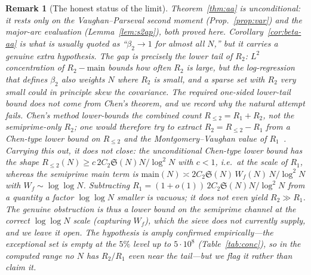 \documentclass[]{interact}%
\newtheorem{remark}{Remark}
\newcommand{\sing}{\mathfrak S}
\begin{document}
\begin{remark}[The honest status of the limit]
Theorem~\ref{thm:aa} is unconditional: it rests only on the Vaughan--Parseval second moment
(Prop.~\ref{prop:var}) and the major-arc evaluation (Lemma~\ref{lem:s2ap}), both proved here.
Corollary~\ref{cor:beta-aa} is what is usually quoted as ``$\beta_2\to1$ for almost all $N$,''
but it carries a genuine extra hypothesis. The gap is precisely the lower tail of $R_2$:
$L^2$ concentration of $R_2-\mathrm{main}$ bounds how often $R_2$ is \emph{large}, but the
log-regression that defines $\beta_2$ also weights $N$ where $R_2$ is \emph{small}, and a
sparse set with $R_2$ very small could in principle skew the covariance. The required
one-sided lower-tail bound does not come from Chen's theorem, and we record \emph{why} the
natural attempt fails. Chen's method lower-bounds the \emph{combined} count $R_{\le2}=R_1+R_2$,
not the semiprime-only $R_2$; one would therefore try to extract $R_2=R_{\le2}-R_1$ from a
Chen-type lower bound on $R_{\le2}$ and the Montgomery--Vaughan value of
$R_1$~\cite{montgomeryvaughan1975}. Carrying this out, it does \emph{not} close: the
unconditional Chen-type lower bound has the shape $R_{\le2}(N)\ge c\,2C_2\sing(N)N/\log^2N$ with
$c<1$, i.e.\ at the \emph{scale of $R_1$}, whereas the semiprime main term is
$\mathrm{main}(N)\asymp2C_2\sing(N)\,W_f(N)\,N/\log^2N$ with $W_f\sim\log\log N$. Subtracting
$R_1=(1+o(1))\,2C_2\sing(N)N/\log^2N$ from a quantity a factor $\log\log N$ \emph{smaller} is
vacuous; it does not even yield $R_2\gg R_1$. The genuine obstruction is thus a lower bound on
the \emph{semiprime channel} at the correct $\log\log N$ scale (capturing $W_f$), which the
sieve does not currently supply, and we leave it open. The hypothesis is amply confirmed
empirically---the exceptional set is
\emph{empty} at the $5\%$ level up to $5\cdot10^{8}$ (Table~\ref{tab:conc}), so in the
computed range no $N$ has $R_2/R_1$ even near the tail---but we flag it rather than claim
it.
\end{remark}
\end{document}
